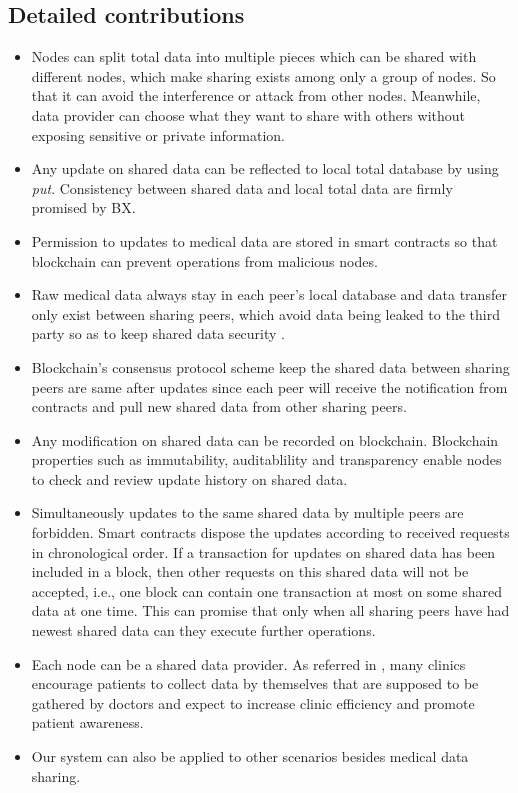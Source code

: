\documentclass[conference]{IEEEtran}
\begin{document}
\subsection{Detailed contributions}
\begin{itemize} %
	\item Nodes can split total data into multiple pieces which can be shared with different nodes, which make sharing exists among only a group of nodes. So that it can avoid the interference or attack from other nodes. Meanwhile, data provider can choose what they want to share with others without exposing sensitive or private information.
	
	\item Any update on shared data can be reflected to local total database by using \emph{put}. Consistency between shared data and local total data are firmly promised by BX. 
	
	\item Permission to updates to medical data are stored in smart contracts so that blockchain can prevent operations from malicious nodes. 
	
	\item Raw medical data always stay in each peer's local database and data transfer only exist between sharing peers, which avoid data being leaked to the third party so as to keep shared data security .
	
	\item Blockchain's  consensus protocol scheme keep the shared data between sharing peers are same after updates since each peer will receive the notification from contracts and pull new shared data from other sharing peers.

	\item Any modification on shared data can be recorded on blockchain. Blockchain properties such as immutability, auditablility and transparency enable nodes to check and review update history on shared data.
	
	\item Simultaneously updates to the same shared data by multiple peers are forbidden. Smart contracts dispose the updates according to received requests in chronological order. If a transaction for updates on shared data has been included in a block, then other requests on this shared data will not be accepted, i.e., one block can contain one transaction at most on some shared data at one time. This can promise that only when all sharing peers have had newest shared data can they execute further operations.
	
	\item Each node can be a shared data provider. As referred in \cite{chung2018using},  many clinics encourage patients to collect data by themselves that are supposed to be gathered by doctors and expect to increase clinic efficiency and promote patient awareness.
	
	\item Our system can also be applied to other scenarios besides medical data sharing.
	
\end{itemize}
\end{document}
